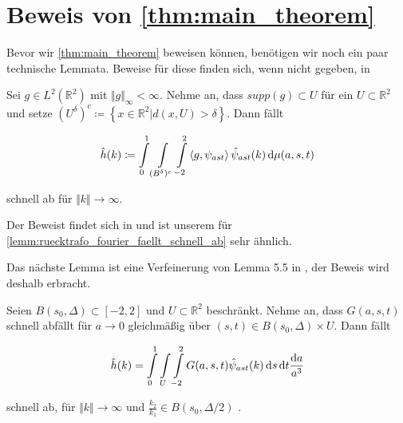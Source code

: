 \section{\texorpdfstring{Beweis von \cref{thm:main_theorem}}{beweis des hauptsatzes}} %
\label{sec:beweis_von_thm:main_theorem}


Bevor wir \cref{thm:main_theorem} beweisen können, benötigen wir noch ein paar technische Lemmata. Beweise für diese finden sich, wenn nicht gegeben, in \cite{Kutyniok2008}

\begin{lemma}
\label{lemm:lemma54}
    Sei $g \in L^2(\mathbb{R}^2)$ mit $\Vert g\Vert_\infty < \infty$. Nehme an, dass $supp (g) \subset U$ für ein $U \subset \mathbb{R}^2$ und setze
    $(U^\delta)^c \coloneqq \left\{x \in \mathbb{R}^2 | d(x,U) > \delta\right\}$.
    Dann fällt

    \begin{equation*}
        \hat h(k) \coloneqq \int \limits_0^1 \int \limits_{(B^\delta)^c} \int \limits_{-2}^{2} \left<g,\psi_{ast}\right> \hat \psi_{ast}(k) \mathop{}\!\mathrm{d} \mu (a,s,t)
    \end{equation*}

    schnell ab für $\Vert k \Vert \to \infty$.
\end{lemma}

Der Beweist findet sich in \cite{Kutyniok2008} und ist unserem für \cref{lemm:ruecktrafo_fourier_faellt_schnell_ab} sehr ähnlich.

Das nächste Lemma ist eine Verfeinerung von Lemma 5.5 in \textcite{Kutyniok2008}, der Beweis wird deshalb erbracht.
\begin{lemma}
\label{lemm:ruecktrafo_fourier_faellt_schnell_ab}

Seien $B(s_0,\Delta) \subset [-2,2]$ und $U \subset \mathbb{R}^2$ beschränkt. Nehme an, dass $G(a,s,t)$ schnell abfällt für $a \to 0$ gleichmäßig über $(s,t) \in  B(s_0,\Delta) \times U$. Dann fällt

\begin{equation*}
    \hat h(k) = \int \limits_0^1 \int \limits_U \int \limits_{-2}^2
    G(a,s,t) \hat \psi_{ast} (k)
        \mathop{}\!\mathrm{d} s \mathop{}\!\mathrm{d} t \frac{\mathop{}\!\mathrm{d} a}{a^3}
\end{equation*}

schnell ab, für $\Vert k \Vert \to \infty$ und $\frac{k_2}{k_1} \in B(s_0, \Delta/2)$ .
\end{lemma}

